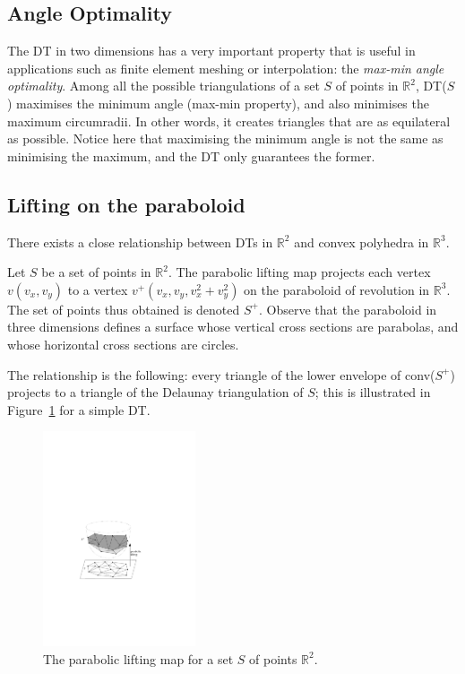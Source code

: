 %
\subsection{Angle Optimality}
The DT in two dimensions has a very important property that is useful in applications such as finite element meshing or interpolation: the \emph{max-min angle optimality}. Among all the possible triangulations of a set $S$ of points in $\mathbb{R}^2$, DT($S$) maximises the minimum angle (max-min property), and also minimises the maximum circumradii. 
In other words, it creates triangles that are as equilateral as possible. 
Notice here that maximising the minimum angle is not the same as minimising the maximum, and the DT only guarantees the former.


\subsection{Lifting on the paraboloid}
\label{sec:parabolic_lifting}

There exists a close relationship between DTs in $\mathbb{R}^{2}$ and convex polyhedra in $\mathbb{R}^{3}$. 

Let $S$ be a set of points in $\mathbb{R}^{2}$. 
The parabolic lifting map projects each vertex $v(v_{x}, v_{y})$ to a vertex $v^{+}(v_{x}, v_{y}, v_{x}^{2}+v_{y}^{2})$ on the paraboloid of revolution in $\mathbb{R}^{3}$. 
The set of points thus obtained is denoted $S^{+}$. 
Observe that the paraboloid in three dimensions defines a surface whose vertical cross sections are parabolas, and whose horizontal cross sections are circles. 

%

The relationship is the following: every triangle of the lower envelope of conv($S^{+}$) projects to a triangle of the Delaunay triangulation of $S$; this is illustrated in Figure~\ref{fig:paraboloid} for a simple DT. 
\begin{figure}
  \centering
  \includegraphics[width=0.4\textwidth]{figs/paraboloid}
  \caption{The parabolic lifting map for a set $S$ of points $\mathbb{R}^2$.}
\label{fig:paraboloid}
\end{figure}

